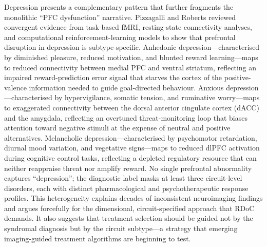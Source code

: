 Depression presents a complementary pattern that further fragments the
monolithic ``PFC dysfunction'' narrative.  Pizzagalli and Roberts reviewed
convergent evidence from task-based fMRI, resting-state connectivity
analyses, and computational reinforcement-learning models to show that
prefrontal disruption in depression is subtype-specific.  Anhedonic
depression---characterised by diminished pleasure, reduced motivation, and
blunted reward learning---maps to reduced connectivity between medial PFC
and ventral striatum, reflecting an impaired reward-prediction error signal
that starves the cortex of the positive-valence information needed to guide
goal-directed behaviour.  Anxious depression---characterised by
hypervigilance, somatic tension, and ruminative worry---maps to exaggerated
connectivity between the dorsal anterior cingulate cortex (dACC) and the
amygdala, reflecting an overtuned threat-monitoring loop that biases
attention toward negative stimuli at the expense of neutral and positive
alternatives.  Melancholic depression---characterised by psychomotor
retardation, diurnal mood variation, and vegetative signs---maps to
reduced dlPFC activation during cognitive control tasks, reflecting a
depleted regulatory resource that can neither reappraise threat nor amplify
reward.  No single prefrontal abnormality captures ``depression''; the
diagnostic label masks at least three circuit-level disorders, each with
distinct pharmacological and psychotherapeutic response profiles.  This
heterogeneity explains decades of inconsistent neuroimaging findings and
argues forcefully for the dimensional, circuit-specified approach that RDoC
demands.  It also suggests that treatment selection should be guided not by
the syndromal diagnosis but by the circuit subtype---a strategy that
emerging imaging-guided treatment algorithms are beginning to test.

